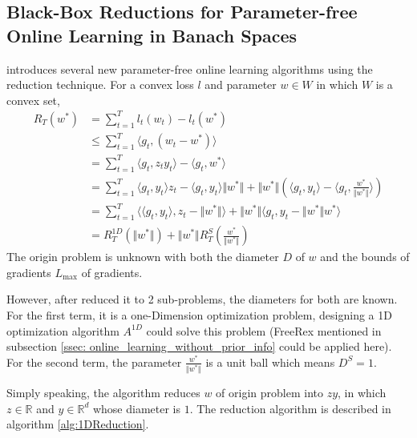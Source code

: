 \subsection{Black-Box Reductions for Parameter-free Online Learning in Banach Spaces}
\cite{Cutkosky2018} introduces several new parameter-free online learning algorithms using the reduction technique. For a convex loss $l$ and parameter $w \in W$ in which $W$ is a convex set, 
\begin{equation}\label{eq:reduction}
\begin{aligned}
    R_T(w^{*}) & = \sum_{t=1}^{T}l_t(w_t)-l_t(w^{*}) \\
               & \leq \sum_{t=1}^{T} \langle g_t, (w_t-w^{*}) \rangle \\
               & = \sum_{t=1}^{T} \langle g_t, z_ty_t \rangle - \langle g_t, w^{*} \rangle \\
               & = \sum_{t=1}^{T} \langle g_t, y_t \rangle z_t - \langle g_t, y_t \rangle {\Vert{w^{*}}\Vert} + {\Vert{w^{*}}\Vert} (\langle g_t, y_t \rangle  - \langle g_t,  \frac{w^{*}} {\Vert{w^{*}}\Vert}\rangle)\\
               & = \sum_{t=1}^{T} \langle \langle g_t, y_t \rangle , z_t-{\Vert{w^{*}}\Vert}\rangle + {\Vert {w^{*}}\Vert} \langle g_t, y_t-{\Vert{w^{*}}\Vert}w^{*}\rangle \\
               & = R_T^{1D}({\Vert {w^{*}}\Vert}) + {\Vert{w^{*}}\Vert} R_T^S( \frac{w^{*}}{\Vert{w^{*}}\Vert})
\end{aligned}
\end{equation}
The origin problem is unknown with both the diameter $D$ of $w$ and the bounds of gradients $L_{\max}$ of gradients. 

However, after reduced it to 2 sub-problems, the diameters for both are known.
For the first term, it is a one-Dimension optimization problem, designing a 1D optimization algorithm $A^{1D}$ could solve this problem (FreeRex mentioned in subsection \ref{ssec: online_learning_without_prior_info} could be applied here). For the second term, the parameter $\frac {w^{*}}{\Vert w^{*} \Vert}$ is a unit ball which means $D^{S} = 1$. 

Simply speaking, the algorithm reduces $w$ of origin problem into $zy$, in which $z \in \mathbb{R}$ and $y \in {\mathbb{R}}^d$ whose diameter is $1$. The reduction algorithm is described in algorithm \ref{alg:1DReduction}. 

